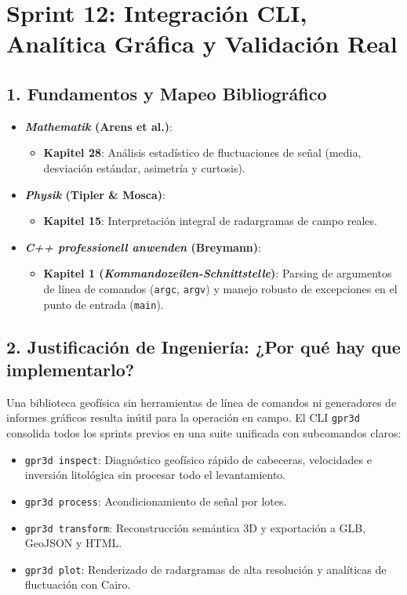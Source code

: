 \documentclass[11pt,a4paper]{article}
\begin{document}
\section{Sprint 12: Integración CLI, Analítica Gráfica y Validación Real}

\subsection{1. Fundamentos y Mapeo Bibliográfico}
\begin{itemize}
    \item \textbf{\textit{Mathematik} (Arens et al.)}:
    \begin{itemize}
        \item \textbf{Kapitel 28}: Análisis estadístico de fluctuaciones de señal (media, desviación estándar, asimetría y curtosis).
    \end{itemize}
    \item \textbf{\textit{Physik} (Tipler \& Mosca)}:
    \begin{itemize}
        \item \textbf{Kapitel 15}: Interpretación integral de radargramas de campo reales.
    \end{itemize}
    \item \textbf{\textit{C++ professionell anwenden} (Breymann)}:
    \begin{itemize}
        \item \textbf{Kapitel 1 (\textit{Kommandozeilen-Schnittstelle})}: Parsing de argumentos de línea de comandos (\texttt{argc}, \texttt{argv}) y manejo robusto de excepciones en el punto de entrada (\texttt{main}).
    \end{itemize}
\end{itemize}

\subsection{2. Justificación de Ingeniería: ¿Por qué hay que implementarlo?}
Una biblioteca geofísica sin herramientas de línea de comandos ni generadores de informes gráficos resulta inútil para la operación en campo. El CLI \texttt{gpr3d} consolida todos los sprints previos en una suite unificada con subcomandos claros:
\begin{itemize}
    \item \texttt{gpr3d inspect}: Diagnóstico geofísico rápido de cabeceras, velocidades e inversión litológica sin procesar todo el levantamiento.
    \item \texttt{gpr3d process}: Acondicionamiento de señal por lotes.
    \item \texttt{gpr3d transform}: Reconstrucción semántica 3D y exportación a GLB, GeoJSON y HTML.
    \item \texttt{gpr3d plot}: Renderizado de radargramas de alta resolución y analíticas de fluctuación con Cairo.
\end{itemize}
\end{document}
